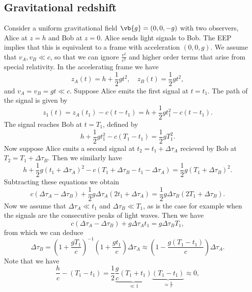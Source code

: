 \documentclass{jknotes}
\begin{document}
\subsection{Gravitational redshift}
Consider a uniform gravitational field \(\vb{g}=(0,0,-g)\) with two observers, Alice at \(z=h\) and Bob at \(z=0\). Alice sends light signals to Bob. The EEP implies that this is equivalent to a frame with acceleration \((0,0,g)\). We assume that \(v_A,v_B\ll c\), so that we can ignore \(\frac{v^2}{c^2}\) and higher order terms that arise from special relativity. In the accelerating frame we have
\begin{equation}
    z_A(t) = h + \frac12gt^2,\quad z_B(t) = \frac12gt^2,
\end{equation}
and \(v_A = v_B = gt \ll c\). Suppose Alice emits the first signal at \(t=t_1\). The path of the signal is given by
\begin{equation}
    z_1(t) = z_A(t_1) - c(t-t_1) = h+\frac12gt_1^2 - c(t-t_1).
\end{equation}
The signal reaches Bob at \(t=T_1\), defined by
\begin{equation}
    h+\frac12gt_1^2 - c(T_1-t_1) = \frac12gT_1^2.
\end{equation}
Now suppose Alice emits a second signal at \(t_2 = t_1 + \Delta\tau_A\) recieved by Bob at \(T_2 = T_1 + \Delta\tau_B\). Then we similarly have
\begin{equation}
    h+\frac12g(t_1+\Delta\tau_A)^2 - c(T_1 + \Delta\tau_B-t_1-\Delta\tau_A) = \frac12g(T_1+\Delta\tau_B)^2.
\end{equation}
Subtracting these equations we obtain
\begin{equation}
    c(\Delta\tau_A - \Delta\tau_B) + \frac12g\Delta\tau_A(2t_1 + \Delta\tau_A) = \frac12g\Delta\tau_B(2T_1+\Delta\tau_B).
\end{equation}
Now we assume that \(\Delta\tau_A\ll t_1\) and \(\Delta\tau_B\ll T_1\), as is the case for example when the signals are the consecutive peaks of light waves. Then we have
\begin{equation}
    c(\Delta\tau_A-\Delta\tau_B) + g\Delta\tau_At_1 = g\Delta\tau_BT_1,
\end{equation}
from which we can deduce
\begin{equation}
    \Delta\tau_B = \left(1+\frac{gT_1}{c}\right)^{-1}\left(1+\frac{gt_1}{c}\right)\Delta\tau_A \approx \left(1 - \frac{g(T_1-t_1)}{c}\right)\Delta\tau_A.
\end{equation}
Note that we have
\begin{equation}
    \frac{h}{c} - (T_1-t_1) = \frac12\underbrace{\frac{g}{c}(T_1+t_1)}_{\ll 1}\underbrace{(T_1-t_1)}_{\approx\frac{h}{c}} \approx 0,
\end{equation}
\end{document}
